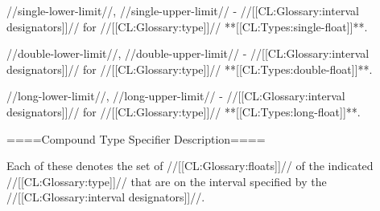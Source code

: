 //single-lower-limit//, //single-upper-limit// - //[[CL:Glossary:interval designators]]// for //[[CL:Glossary:type]]// **[[CL:Types:single-float]]**. 

//double-lower-limit//, //double-upper-limit// - //[[CL:Glossary:interval designators]]// for //[[CL:Glossary:type]]// **[[CL:Types:double-float]]**. 

//long-lower-limit//, //long-upper-limit// - //[[CL:Glossary:interval designators]]// for //[[CL:Glossary:type]]// **[[CL:Types:long-float]]**. 

====Compound Type Specifier Description====

Each of these denotes the set of //[[CL:Glossary:floats]]// of the indicated //[[CL:Glossary:type]]// that are on the interval specified by the //[[CL:Glossary:interval designators]]//.

   
